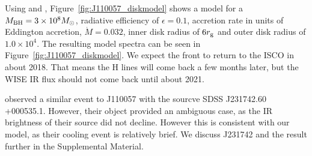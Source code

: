 \documentclass{nature}
\begin{document}
Using \cite{Ford2018} and \cite{Sirko_Goodman2003},
Figure~\ref{fig:J110057_diskmodel} shows a model for a $M_{\rm
BH}=3\times 10^{8} M_{\odot}$, radiative efficiency of $\epsilon=0.1$,
accretion rate in units of Eddington accretion, $\dot{M}=0.032$, inner
disk radius of $6r_{\rm g}$ and outer disk radius of $1.0 \times
10^{4}$. The resulting model spectra can be seen in
Figure~\ref{fig:J110057_diskmodel}.  We expect the front to return to
the ISCO in about 2018. That means the H lines will come back a few
months later, but the WISE IR flux should not come back until about
2021.

\cite{Guo2016} observed a similar event to J110057 with the sourcve
SDSS J231742.60 +000535.1. However, their object provided an ambiguous
case, as the IR brightness of their source did not decline. However
this is consistent with our model, as their cooling event is
relatively brief.  We discuss J231742 and the \citet{Guo2016} result
further in the Supplemental Material.




%

%
\end{document}
